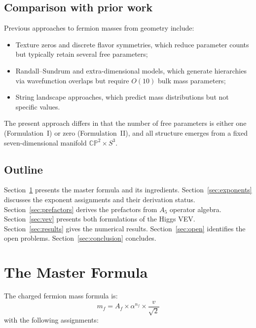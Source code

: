 \documentclass[11pt,a4paper]{article}
\newcommand{\CP}{\mathbb{CP}}
\theoremstyle{definition}
\theoremstyle{remark}
\begin{document}
\subsection{Comparison with prior work}

Previous approaches to fermion masses from geometry include:
\begin{itemize}
\item Texture zeros and discrete flavor symmetries, which reduce
  parameter counts but typically retain several free parameters;
\item Randall--Sundrum and extra-dimensional models, which generate
  hierarchies via wavefunction overlaps but require $O(10)$
  bulk mass parameters;
\item String landscape approaches, which predict mass distributions
  but not specific values.
\end{itemize}

The present approach differs in that the number of free parameters
is either one (Formulation~I) or zero (Formulation~II), and all
structure emerges from a fixed seven-dimensional manifold
$\CP^2\times S^3$.

\subsection{Outline}

Section~\ref{sec:formula} presents the master formula and its
ingredients.
Section~\ref{sec:exponents} discusses the exponent assignments
and their derivation status.
Section~\ref{sec:prefactors} derives the prefactors from
$A_5$ operator algebra.
Section~\ref{sec:vev} presents both formulations of the Higgs VEV.
Section~\ref{sec:results} gives the numerical results.
Section~\ref{sec:open} identifies the open problems.
Section~\ref{sec:conclusion} concludes.

\section{The Master Formula}
\label{sec:formula}

The charged fermion mass formula is:
\begin{equation}\label{eq:master2}
\boxed{m_f = A_f \times \alpha^{n_f} \times \frac{v}{\sqrt{2}}}
\end{equation}
with the following assignments:
\end{document}
